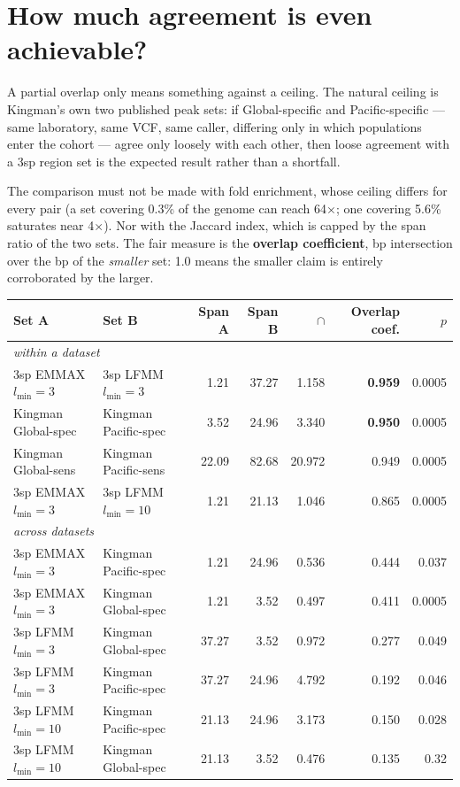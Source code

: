 \documentclass[11pt,a4paper]{article}
\begin{document}
\section{How much agreement is even achievable?}\label{sec:ceiling}

A partial overlap only means something against a ceiling. The natural ceiling is Kingman's
own two published peak sets: if Global-specific and Pacific-specific --- same laboratory,
same VCF, same caller, differing only in which populations enter the cohort --- agree only
loosely with each other, then loose agreement with a 3sp region set is the expected result
rather than a shortfall.

The comparison must not be made with fold enrichment, whose ceiling differs for every pair
(a set covering 0.3\% of the genome can reach 64$\times$; one covering 5.6\% saturates near
4$\times$). Nor with the Jaccard index, which is capped by the span ratio of the two sets.
The fair measure is the \textbf{overlap coefficient}, bp intersection over the bp of the
\emph{smaller} set: 1.0 means the smaller claim is entirely corroborated by the larger.

\begin{table}[h]\centering\small
\begin{tabular}{llrrrrr}\toprule
Set A & Set B & Span A & Span B & $\cap$ & \textbf{Overlap coef.} & $p$ \\ \midrule
\multicolumn{7}{l}{\emph{within a dataset}}\\
3sp EMMAX $l_{\min}{=}3$ & 3sp LFMM $l_{\min}{=}3$ & 1.21 & 37.27 & 1.158 & \textbf{0.959} & 0.0005 \\
Kingman Global-spec & Kingman Pacific-spec & 3.52 & 24.96 & 3.340 & \textbf{0.950} & 0.0005 \\
Kingman Global-sens & Kingman Pacific-sens & 22.09 & 82.68 & 20.972 & 0.949 & 0.0005 \\
3sp EMMAX $l_{\min}{=}3$ & 3sp LFMM $l_{\min}{=}10$ & 1.21 & 21.13 & 1.046 & 0.865 & 0.0005 \\ \midrule
\multicolumn{7}{l}{\emph{across datasets}}\\
3sp EMMAX $l_{\min}{=}3$ & Kingman Pacific-spec & 1.21 & 24.96 & 0.536 & 0.444 & 0.037 \\
3sp EMMAX $l_{\min}{=}3$ & Kingman Global-spec & 1.21 & 3.52 & 0.497 & 0.411 & 0.0005 \\
3sp LFMM $l_{\min}{=}3$ & Kingman Global-spec & 37.27 & 3.52 & 0.972 & 0.277 & 0.049 \\
3sp LFMM $l_{\min}{=}3$ & Kingman Pacific-spec & 37.27 & 24.96 & 4.792 & 0.192 & 0.046 \\
3sp LFMM $l_{\min}{=}10$ & Kingman Pacific-spec & 21.13 & 24.96 & 3.173 & 0.150 & 0.028 \\
3sp LFMM $l_{\min}{=}10$ & Kingman Global-spec & 21.13 & 3.52 & 0.476 & 0.135 & 0.32 \\ \bottomrule
\end{tabular}
\end{table}
\end{document}
